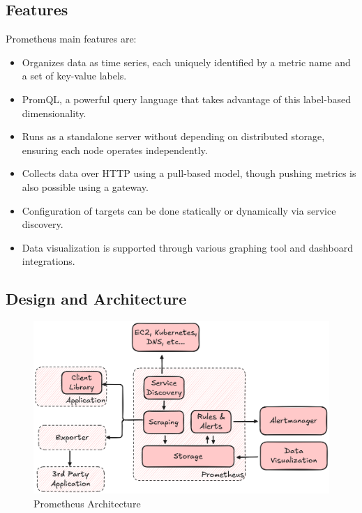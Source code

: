 \subsection{Features}\label{subsec:features}

Prometheus main features are:

\begin{itemize}
    \item Organizes data as time series, each uniquely identified by a metric name and a set of key-value labels.
    \item PromQL, a powerful query language that takes advantage of this label-based dimensionality.
    \item Runs as a standalone server without depending on distributed storage, ensuring each node operates
    independently.
    \item Collects data over HTTP using a pull-based model, though pushing metrics is also possible using a gateway.
    \item Configuration of targets can be done statically or dynamically via service discovery.
    \item Data visualization is supported through various graphing tool and dashboard integrations.
\end{itemize}

\subsection{Design and Architecture}\label{subsec:design-and-architecture}

\begin{figure}[h]
    \centering
    \includegraphics[width=\linewidth, keepaspectratio]{./figures/prometheus_arch}
    \caption{Prometheus Architecture}
\end{figure}


